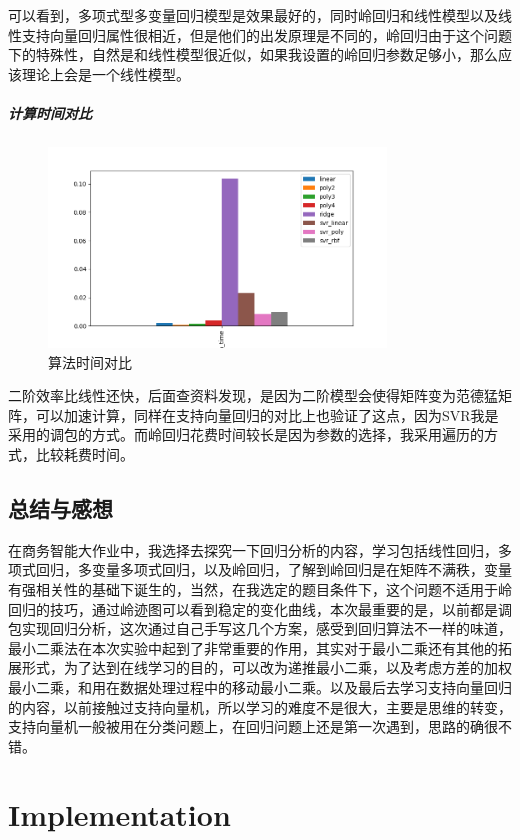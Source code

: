 \documentclass{ctexart}
\begin{document}
可以看到，多项式型多变量回归模型是效果最好的，同时岭回归和线性模型以及线性支持向量回归属性很相近，但是他们的出发原理是不同的，岭回归由于这个问题下的特殊性，自然是和线性模型很近似，如果我设置的岭回归参数足够小，那么应该理论上会是一个线性模型。
\subparagraph{计算时间对比}
\begin{figure}[H]
	\includegraphics[width=0.8\textwidth]{../images/e5.png}
	\caption{算法时间对比}
\end{figure}
二阶效率比线性还快，后面查资料发现，是因为二阶模型会使得矩阵变为范德猛矩阵，可以加速计算，同样在支持向量回归的对比上也验证了这点，因为SVR我是采用的调包的方式。而岭回归花费时间较长是因为参数的选择，我采用遍历的方式，比较耗费时间。
\subsection{总结与感想}
在商务智能大作业中，我选择去探究一下回归分析的内容，学习包括线性回归，多项式回归，多变量多项式回归，以及岭回归，了解到岭回归是在矩阵不满秩，变量有强相关性的基础下诞生的，当然，在我选定的题目条件下，这个问题不适用于岭回归的技巧，通过岭迹图可以看到稳定的变化曲线，本次最重要的是，以前都是调包实现回归分析，这次通过自己手写这几个方案，感受到回归算法不一样的味道，最小二乘法在本次实验中起到了非常重要的作用，其实对于最小二乘还有其他的拓展形式，为了达到在线学习的目的，可以改为递推最小二乘，以及考虑方差的加权最小二乘，和用在数据处理过程中的移动最小二乘。以及最后去学习支持向量回归的内容，以前接触过支持向量机，所以学习的难度不是很大，主要是思维的转变，支持向量机一般被用在分类问题上，在回归问题上还是第一次遇到，思路的确很不错。




\section{Implementation}
\end{document}
